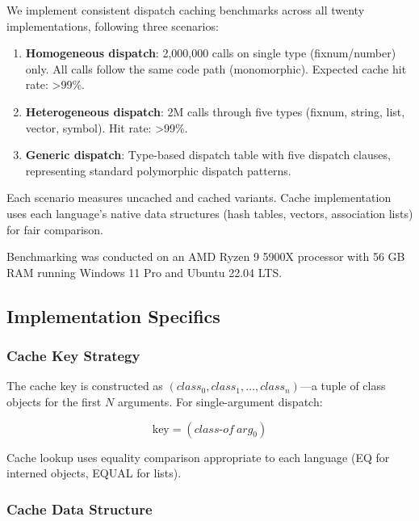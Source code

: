 \documentclass[sigplan,final]{acmart}
\begin{document}
We implement consistent dispatch caching benchmarks across all twenty implementations, following
three scenarios:

\begin{enumerate}
  \item \textbf{Homogeneous dispatch}: 2,000,000 calls on single type (fixnum/number) only.
    All calls follow the same code path (monomorphic). Expected cache hit rate: >99\%.

  \item \textbf{Heterogeneous dispatch}: 2M calls through five types
    (fixnum, string, list, vector, symbol). Hit rate: >99\%.

  \item \textbf{Generic dispatch}: Type-based dispatch table with five dispatch clauses,
    representing standard polymorphic dispatch patterns.
\end{enumerate}

Each scenario measures uncached and cached variants. Cache implementation uses each
language's native data structures (hash tables, vectors, association lists) for fair comparison.

Benchmarking was conducted on
an AMD Ryzen 9 5900X processor with 56 GB RAM running Windows 11 Pro and Ubuntu 22.04 LTS.

\subsection{Implementation Specifics}

\subsubsection{Cache Key Strategy}

The cache key is constructed as $(class_0, class_1, \ldots, class_n)$—a tuple of class objects
for the first $N$ arguments. For single-argument dispatch:

\begin{equation}
\text{key} = (class\text{-}of~arg_0)
\end{equation}

Cache lookup uses equality comparison appropriate to each language (EQ for interned objects,
EQUAL for lists).

\subsubsection{Cache Data Structure}
\end{document}
